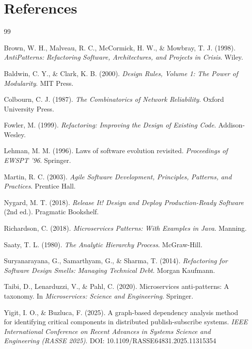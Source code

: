 \documentclass[11pt]{article}
\begin{document}
\section{References}

\begin{thebibliography}{99}

 Brown, W. H., Malveau, R. C., McCormick, H. W., \& Mowbray, T. J. (1998). \emph{AntiPatterns: Refactoring Software, Architectures, and Projects in Crisis}. Wiley.

 Baldwin, C. Y., \& Clark, K. B. (2000). \emph{Design Rules, Volume 1: The Power of Modularity}. MIT Press.

 Colbourn, C. J. (1987). \emph{The Combinatorics of Network Reliability}. Oxford University Press.

 Fowler, M. (1999). \emph{Refactoring: Improving the Design of Existing Code}. Addison-Wesley.

 Lehman, M. M. (1996). Laws of software evolution revisited. \emph{Proceedings of EWSPT '96}. Springer.

 Martin, R. C. (2003). \emph{Agile Software Development, Principles, Patterns, and Practices}. Prentice Hall.

 Nygard, M. T. (2018). \emph{Release It! Design and Deploy Production-Ready Software} (2nd ed.). Pragmatic Bookshelf.

 Richardson, C. (2018). \emph{Microservices Patterns: With Examples in Java}. Manning.

 Saaty, T. L. (1980). \emph{The Analytic Hierarchy Process}. McGraw-Hill.

 Suryanarayana, G., Samarthyam, G., \& Sharma, T. (2014). \emph{Refactoring for Software Design Smells: Managing Technical Debt}. Morgan Kaufmann.

 Taibi, D., Lenarduzzi, V., \& Pahl, C. (2020). Microservices anti-patterns: A taxonomy. In \emph{Microservices: Science and Engineering}. Springer.

 Yigit, I. O., \& Buzluca, F. (2025). A graph-based dependency analysis method for identifying critical components in distributed publish-subscribe systems. \emph{IEEE International Conference on Recent Advances in Systems Science and Engineering (RASSE 2025)}. DOI: 10.1109/RASSE64831.2025.11315354

\end{thebibliography}
\end{document}
